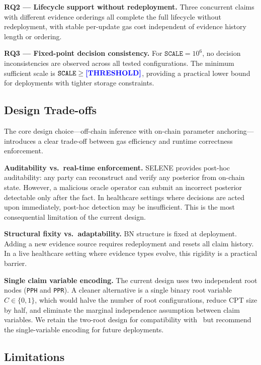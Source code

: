 \documentclass[journal]{IEEEtran}
\newcommand{\placeholder}[1]{\textcolor{blue}{\textbf{[#1]}}}
\begin{document}
\textbf{RQ2 --- Lifecycle support without
redeployment.}
Three concurrent claims with different evidence
orderings all complete the full lifecycle without
redeployment, with stable per-update gas cost
independent of evidence history length or ordering.

\textbf{RQ3 --- Fixed-point decision consistency.}
For $\texttt{SCALE}=10^6$, no decision
inconsistencies are observed across all tested
configurations. The minimum sufficient scale is
$\texttt{SCALE}\geq\placeholder{THRESHOLD}$,
providing a practical lower bound for deployments
with tighter storage constraints.

\subsection{Design Trade-offs}

The core design choice---off-chain inference with
on-chain parameter anchoring---introduces a clear
trade-off between gas efficiency and runtime
correctness enforcement.

\textbf{Auditability vs.\ real-time enforcement.}
SELENE provides post-hoc auditability: any party can
reconstruct and verify any posterior from on-chain
state. However, a malicious oracle operator can
submit an incorrect posterior detectable only after
the fact. In healthcare settings where decisions are
acted upon immediately, post-hoc detection may be
insufficient. This is the most consequential
limitation of the current design.

\textbf{Structural fixity vs.\ adaptability.}
BN structure is fixed at deployment. Adding a new
evidence source requires redeployment and resets all
claim history. In a live healthcare setting where
evidence types evolve, this rigidity is a practical
barrier.

\textbf{Single claim variable encoding.}
The current design uses two independent root nodes
(\texttt{PPH} and \texttt{PPR}). A cleaner
alternative is a single binary root variable
$C\in\{0,1\}$, which would halve the number of root
configurations, reduce CPT size by half, and
eliminate the marginal independence assumption between
claim variables. We retain the two-root design for
compatibility with~\cite{bn-oracle} but recommend the
single-variable encoding for future deployments.

\subsection{Limitations}
\label{sec:limitations}
\end{document}
